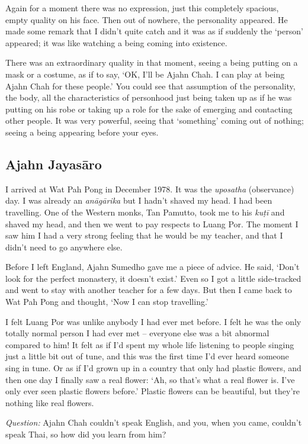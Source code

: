 Again for a moment there was no expression, just this completely
spacious, empty quality on his face. Then out of nowhere, the
personality appeared. He made some remark that I didn't quite catch and
it was as if suddenly the `person' appeared; it was like watching a
being coming into existence.

There was an extraordinary quality in that
moment, seeing a being putting on a mask or a costume, as if to say, 
`OK, I'll be Ajahn Chah. I can play at being Ajahn Chah for these
people.' You could see that assumption of the personality, the body, all
the characteristics of personhood just being taken up as if he was
putting on his robe or taking up a role for the sake of emerging and
contacting other people. It was very powerful, seeing that `something'
coming out of nothing; seeing a being appearing before your eyes. 

\subsection{Ajahn Jayasāro}

I arrived at Wat Pah Pong in December 1978. It was the \emph{uposatha}
 (observance) day. I was already an \emph{anāgārika} but I hadn't shaved
my head. I had been travelling. One of the Western monks, Tan Pamutto, 
took me to his \emph{kuṭī} and shaved my head, and then we went to pay
respects to Luang Por. The moment I saw him I had a very strong feeling
that he would be my teacher, and that I didn't need to go anywhere else. 

Before I left England, Ajahn Sumedho gave me a piece of advice. He said, 
`Don't look for the perfect monastery, it doesn't exist.' Even so I got
a little side-tracked and went to stay with another teacher for a few
days. But then I came back to Wat Pah Pong and thought, `Now I can stop
travelling.'

I felt Luang Por was unlike anybody I had ever met before. I felt he was
the only totally normal person I had ever met -- everyone else was a bit
abnormal compared to him! It felt as if I'd spent my whole life
listening to people singing just a little bit out of tune, and this was
the first time I'd ever heard someone sing in tune. Or as if I'd grown
up in a country that only had plastic flowers, and then one day I
finally saw a real flower: `Ah, so that's what a real flower is. I've
only ever seen plastic flowers before.' Plastic flowers can be
beautiful, but they're nothing like real flowers.

\emph{Question:} Ajahn Chah couldn't speak English, and you, when you
came, couldn't speak Thai, so how did you learn from him?

